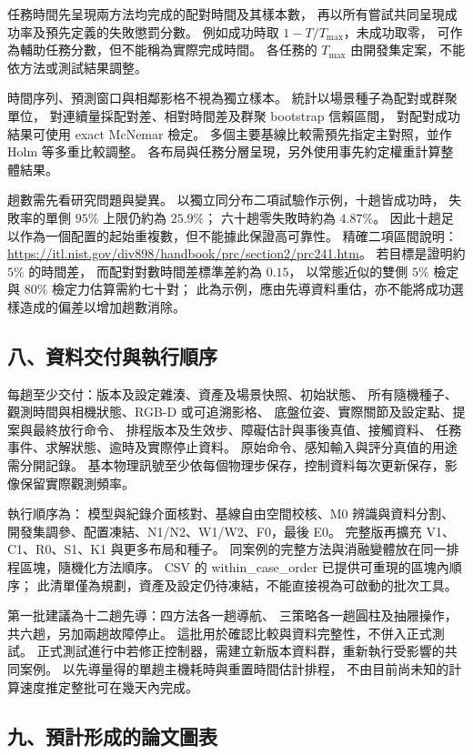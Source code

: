 任務時間先呈現兩方法均完成的配對時間及其樣本數，
再以所有嘗試共同呈現成功率及預先定義的失敗懲罰分數。
例如成功時取 $1-T/T_{\max}$，未成功取零，
可作為輔助任務分數，但不能稱為實際完成時間。
各任務的 $T_{\max}$ 由開發集定案，不能依方法或測試結果調整。

時間序列、預測窗口與相鄰影格不視為獨立樣本。
統計以場景種子為配對或群聚單位，
對連續量採配對差、相對時間差及群聚 bootstrap 信賴區間，
對配對成功結果可使用 exact McNemar 檢定。
多個主要基線比較需預先指定主對照，並作 Holm 等多重比較調整。
各布局與任務分層呈現，另外使用事先約定權重計算整體結果。

趟數需先看研究問題與變異。
以獨立同分布二項試驗作示例，十趟皆成功時，
失敗率的單側 $95\%$ 上限仍約為 $25.9\%$；
六十趟零失敗時約為 $4.87\%$。
因此十趟足以作為一個配置的起始重複數，但不能據此保證高可靠性。
精確二項區間說明：
\url{https://itl.nist.gov/div898/handbook/prc/section2/prc241.htm}。
若目標是證明約 $5\%$ 的時間差，
而配對對數時間差標準差約為 $0.15$，
以常態近似的雙側 $5\%$ 檢定與 $80\%$ 檢定力估算需約七十對；
此為示例，應由先導資料重估，亦不能將成功選樣造成的偏差以增加趟數消除。

\subsection*{八、資料交付與執行順序}

每趟至少交付：版本及設定雜湊、資產及場景快照、初始狀態、
所有隨機種子、觀測時間與相機狀態、RGB-D 或可追溯影格、
底盤位姿、實際關節及設定點、提案與最終放行命令、
排程版本及生效步、障礙估計與事後真值、接觸資料、
任務事件、求解狀態、逾時及實際停止資料。
原始命令、感知輸入與評分真值的用途需分開記錄。
基本物理訊號至少依每個物理步保存，控制資料每次更新保存，影像保留實際觀測頻率。

執行順序為：
模型與紀錄介面核對、基線自由空間校核、M0 辨識與資料分割、
開發集調參、配置凍結、N1/N2、W1/W2、F0，最後 E0。
完整版再擴充 V1、C1、R0、S1、K1 與更多布局和種子。
同案例的完整方法與消融變體放在同一排程區塊，隨機化方法順序。
CSV 的 within\_case\_order 已提供可重現的區塊內順序；
此清單僅為規劃，資產及設定仍待凍結，不能直接視為可啟動的批次工具。

第一批建議為十二趟先導：四方法各一趟導航、
三策略各一趟圓柱及抽屜操作，共六趟，另加兩趟故障停止。
這批用於確認比較與資料完整性，不併入正式測試。
正式測試進行中若修正控制器，需建立新版本資料群，重新執行受影響的共同案例。
以先導量得的單趟主機耗時與重置時間估計排程，
不由目前尚未知的計算速度推定整批可在幾天內完成。

\subsection*{九、預計形成的論文圖表}

